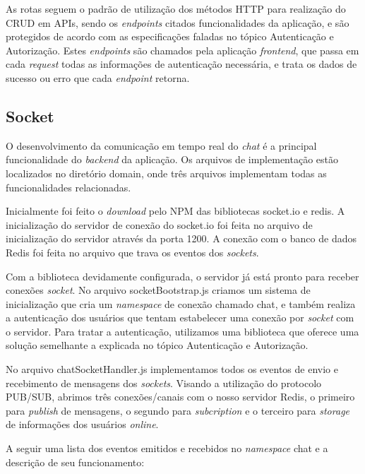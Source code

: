 As rotas seguem o padrão de utilização dos métodos HTTP para realização do CRUD em APIs, sendo os \textit{endpoints} citados funcionalidades da aplicação, e são protegidos de acordo com as especificações faladas no tópico Autenticação e Autorização. Estes \textit{endpoints} são chamados pela aplicação \textit{frontend}, que passa em cada \textit{request} todas as informações de autenticação necessária, e trata os dados de sucesso ou erro que cada \textit{endpoint} retorna.

\subsection{Socket}
O desenvolvimento da comunicação em tempo real do \textit{chat} é a principal funcionalidade do \textit{backend} da aplicação. Os arquivos de implementação estão localizados no diretório domain, onde três arquivos implementam todas as funcionalidades relacionadas.

Inicialmente foi feito o \textit{download} pelo NPM das bibliotecas socket.io e redis. A inicialização do servidor de conexão do socket.io foi feita no arquivo de inicialização do servidor através da porta 1200. A conexão com o banco de dados Redis foi feita no arquivo que trava os eventos dos \textit{sockets}.

Com a biblioteca devidamente configurada, o servidor já está pronto para receber conexões \textit{socket}. No arquivo socketBootstrap.js criamos um sistema de inicialização que cria um \textit{namespace} de conexão chamado chat, e também realiza a autenticação dos usuários que tentam estabelecer uma conexão por \textit{socket} com o servidor. Para tratar a autenticação, utilizamos uma biblioteca \cite{socketio-auth} que oferece uma solução semelhante a explicada no tópico Autenticação e Autorização.

No arquivo chatSocketHandler.js implementamos todos os eventos de envio e recebimento de mensagens dos \textit{sockets}. Visando a utilização do protocolo PUB/SUB, abrimos três conexões/canais com o nosso servidor Redis, o primeiro para \textit{publish} de mensagens, o segundo para \textit{subcription} e o terceiro para \textit{storage} de informações dos usuários \textit{online}.

A seguir uma lista dos eventos emitidos e recebidos no \textit{namespace} chat e a descrição de seu funcionamento:

